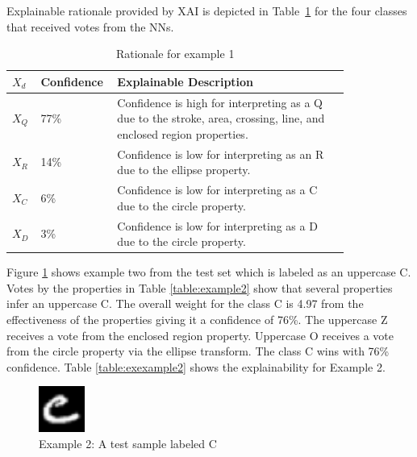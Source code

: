 \documentclass[conference]{IEEEtran}
\begin{document}
Explainable rationale provided by XAI is depicted in Table~\ref{table:exexample1} for the four classes that
received votes from the NNs.

\begin{table}
    \caption{Rationale for example 1}
    \centering
    \begin{tabular}{| p{0.04\linewidth} | p{0.14\linewidth} | p{0.65\linewidth} |}
    \hline
     $X_d$ & Confidence & Explainable Description \\
    \hline \cline{1-3}
    $X_Q$ & 77\% & Confidence is high for interpreting as a Q due to the stroke, area, crossing, line, and enclosed region properties. \\ 
    \hline
    $X_R$ & 14\% & Confidence is low for interpreting as an R due to the ellipse property. \\
    \hline
    $X_C$ & 6\% & Confidence is low for interpreting as a C due to the circle property. \\
    \hline
    $X_D$ & 3\% & Confidence is low for interpreting as a D due to the circle property. \\
    \hline
    \end{tabular}
    \label{table:exexample1}
\end{table}

Figure \ref{fig:ex2} shows example two from the test set which is labeled as an
uppercase C. Votes by the properties in Table \ref{table:example2} show that
several properties infer an uppercase C.  The overall weight for the class C is
4.97 from the effectiveness of the properties giving it a confidence of 76\%.
The uppercase Z receives a vote from the enclosed region property. Uppercase O
receives a vote from the circle property via the ellipse transform.  The class C
wins with 76\% confidence. Table \ref{table:exexample2} shows the explainability
for Example 2.

\begin{figure}
    \centering
    \includegraphics[width=1.5cm]{./images/examples/test-C-1.png}
    \caption{Example 2: A test sample labeled C}
    \label{fig:ex2}
\end{figure}
\end{document}
